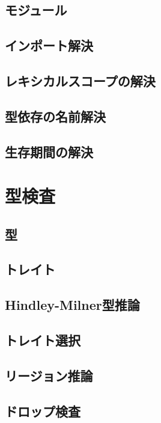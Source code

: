 \documentclass[dvipdfmx,uplatex,papersize,a4paper,10pt]{jsbook}
\theoremstyle{definition}
\begin{document}
\section{モジュール}

\section{インポート解決}

\section{レキシカルスコープの解決}

\section{型依存の名前解決}

\section{生存期間の解決}



\chapter{型検査}

\section{型}

\section{トレイト}

\section{Hindley-Milner型推論}

\section{トレイト選択}

\section{リージョン推論}

\section{ドロップ検査}
\end{document}
